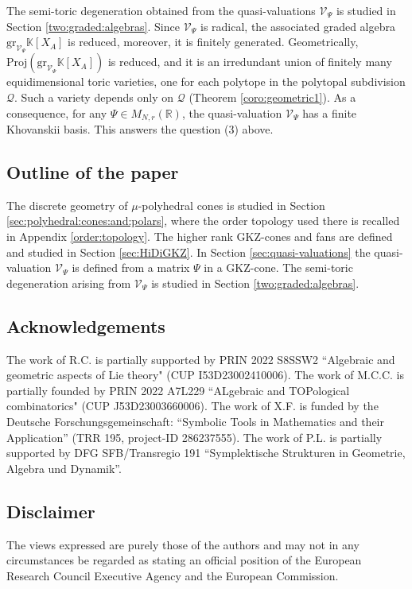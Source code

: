\documentclass[12pt, a4article]{amsart}   	%
\numberwithin{equation}{section}
\theoremstyle{plain}
\theoremstyle{definition}
\begin{document}
The semi-toric degeneration obtained from the quasi-valuations $\mathcal{V}_\Psi$ is studied in Section \ref{two:graded:algebras}. Since $\mathcal{V}_\Psi$ is radical, the associated graded algebra $\mathrm{gr}_{\mathcal{V}_\Psi}\mathbb{K}[X_A]$ is reduced, moreover, it is finitely generated. Geometrically, $\mathrm{Proj}(\mathrm{gr}_{\mathcal{V}_\Psi}\mathbb{K}[X_A])$ is reduced, and it is an irredundant union of finitely many equidimensional toric varieties, one for each polytope in the polytopal subdivision $\mathcal{Q}$. Such a variety depends only on $\mathcal{Q}$ (Theorem \ref{coro:geometric1}). As a consequence, for any $\Psi\in M_{N,r}(\mathbb{R})$, the quasi-valuation
$\mathcal{V}_\Psi$ has a finite Khovanskii basis. This answers the question (3) above.
 

\subsection{Outline of the paper}

The discrete geometry of $\mu$-polyhedral cones is studied in Section \ref{sec:polyhedral:cones:and:polars}, where the order topology used there is recalled in Appendix \ref{order:topology}. The higher rank GKZ-cones and fans are defined and studied in Section \ref{sec:HiDiGKZ}. In Section \ref{sec:quasi-valuations} the quasi-valuation $\mathcal{V}_\Psi$ is defined from a matrix $\Psi$ in a GKZ-cone. The semi-toric degeneration arising from $\mathcal{V}_\Psi$ is studied in Section \ref{two:graded:algebras}.

\subsection{Acknowledgements}
The work of R.C. is partially supported by PRIN 2022 S8SSW2 ``Algebraic and geometric aspects of Lie theory" (CUP I53D23002410006). The work of M.C.C. is partially founded by PRIN 2022 A7L229 ``ALgebraic and TOPological combinatorics" (CUP J53D23003660006). The work of X.F. is funded by the Deutsche Forschungsgemeinschaft: “Symbolic Tools in Mathematics and their Application” (TRR 195, project-ID 286237555). The work of P.L. is partially supported by DFG SFB/Transregio 191 ``Symplektische Strukturen in Geometrie, Algebra und Dynamik''.

\subsection{Disclaimer}
The views expressed are purely those of the authors and may not in any circumstances be regarded as stating an official position of the European Research Council Executive Agency and the European Commission.
\end{document}
